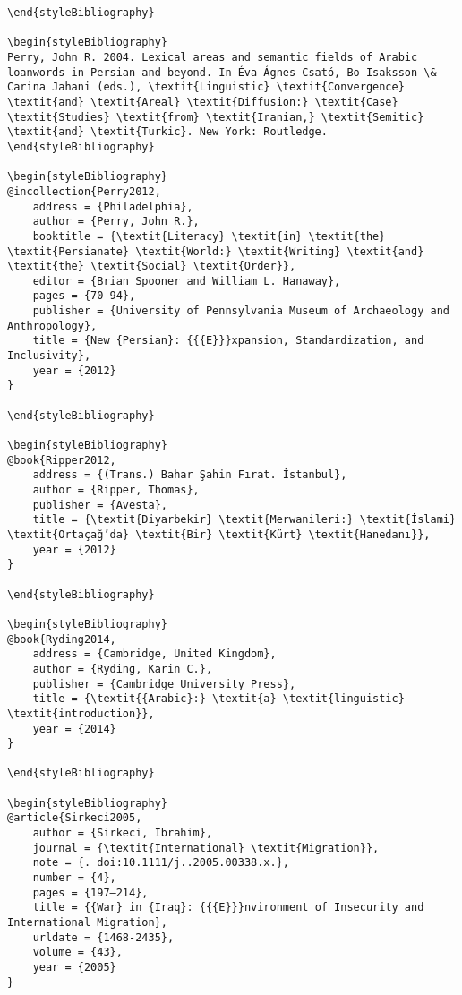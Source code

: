 \documentclass[output=paper]{langsci/langscibook}
\begin{document}
\begin{verbatim}
\end{styleBibliography}

\begin{styleBibliography}
Perry, John R. 2004. Lexical areas and semantic fields of Arabic loanwords in Persian and beyond. In Éva Ágnes Csató, Bo Isaksson \& Carina Jahani (eds.), \textit{Linguistic} \textit{Convergence} \textit{and} \textit{Areal} \textit{Diffusion:} \textit{Case} \textit{Studies} \textit{from} \textit{Iranian,} \textit{Semitic} \textit{and} \textit{Turkic}. New York: Routledge.
\end{styleBibliography}

\begin{styleBibliography}
@incollection{Perry2012,
	address = {Philadelphia},
	author = {Perry, John R.},
	booktitle = {\textit{Literacy} \textit{in} \textit{the} \textit{Persianate} \textit{World:} \textit{Writing} \textit{and} \textit{the} \textit{Social} \textit{Order}},
	editor = {Brian Spooner and William L. Hanaway},
	pages = {70–94},
	publisher = {University of Pennsylvania Museum of Archaeology and Anthropology},
	title = {New {Persian}: {{{E}}}xpansion, Standardization, and Inclusivity},
	year = {2012}
}

\end{styleBibliography}

\begin{styleBibliography}
@book{Ripper2012,
	address = {(Trans.) Bahar Şahin Fırat. İstanbul},
	author = {Ripper, Thomas},
	publisher = {Avesta},
	title = {\textit{Diyarbekir} \textit{Merwanileri:} \textit{İslami} \textit{Ortaçağ’da} \textit{Bir} \textit{Kürt} \textit{Hanedanı}},
	year = {2012}
}

\end{styleBibliography}

\begin{styleBibliography}
@book{Ryding2014,
	address = {Cambridge, United Kingdom},
	author = {Ryding, Karin C.},
	publisher = {Cambridge University Press},
	title = {\textit{{Arabic}:} \textit{a} \textit{linguistic} \textit{introduction}},
	year = {2014}
}

\end{styleBibliography}

\begin{styleBibliography}
@article{Sirkeci2005,
	author = {Sirkeci, Ibrahim},
	journal = {\textit{International} \textit{Migration}},
	note = {. doi:10.1111/j..2005.00338.x.},
	number = {4},
	pages = {197–214},
	title = {{War} in {Iraq}: {{{E}}}nvironment of Insecurity and International Migration},
	urldate = {1468-2435},
	volume = {43},
	year = {2005}
}


\end{verbatim}
\end{document}
